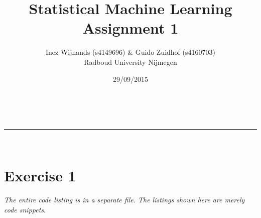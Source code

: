 \documentclass[a4paper,11pt]{article}
\makeatletter
\newcommand{\linia}{\rule{\linewidth}{0.5pt}}
\theoremstyle{mytheor}
\renewcommand{\maketitle}{
\begin{center}
\vspace{2ex}
{\huge \textsc{\@title}}
\vspace{1ex}
\\
\linia\\
\@author  \@date
\vspace{4ex}
\end{center}
}
\makeatother
\begin{document}
\title{Statistical Machine Learning \\ Assignment 1}

\author{Inez Wijnands (s4149696) \& Guido Zuidhof (s4160703)\\ Radboud University Nijmegen\\}

\date{29/09/2015}

\maketitle

\section*{Exercise 1}
\textit{The entire code listing is in a separate file. The listings shown here are merely code snippets}.
\end{document}
